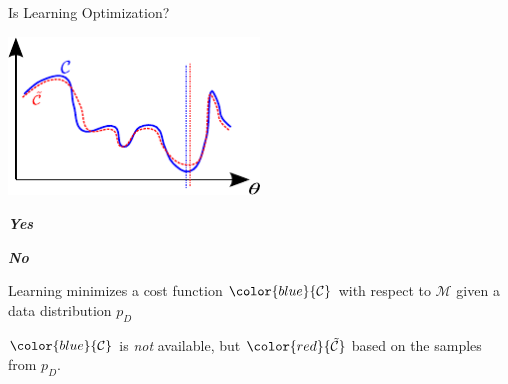 \documentclass{beamer}
\newcommand{\CC}[0]{\mathcal{C}}
\newcommand{\MM}[0]{\mathcal{M}}
\begin{document}
\begin{frame}{Is Learning Optimization?}

    \centering
    \includegraphics[width=0.5\textwidth]{cost_both.pdf}

    \begin{minipage}{0.48\textwidth}
        \textbf{\emph{Yes}}
    \end{minipage}
    \hfill
    \begin{minipage}{0.48\textwidth}
        \textbf{\emph{No}}
    \end{minipage}


    \begin{minipage}[t]{0.48\textwidth}
        \vspace{0pt}
    Learning minimizes a cost function $\color{blue}{\CC}$ with respect to
    $\MM$ given a data distribution $p_D$

    \end{minipage}
    \hfill
    \begin{minipage}[t]{0.48\textwidth}
        \vspace{0pt}
    $\color{blue}{\CC}$ is \emph{not} available, but $\color{red}{\tilde{\CC}}$ based
    on the samples from $p_D$.

    \end{minipage}

\end{frame}
\end{document}
